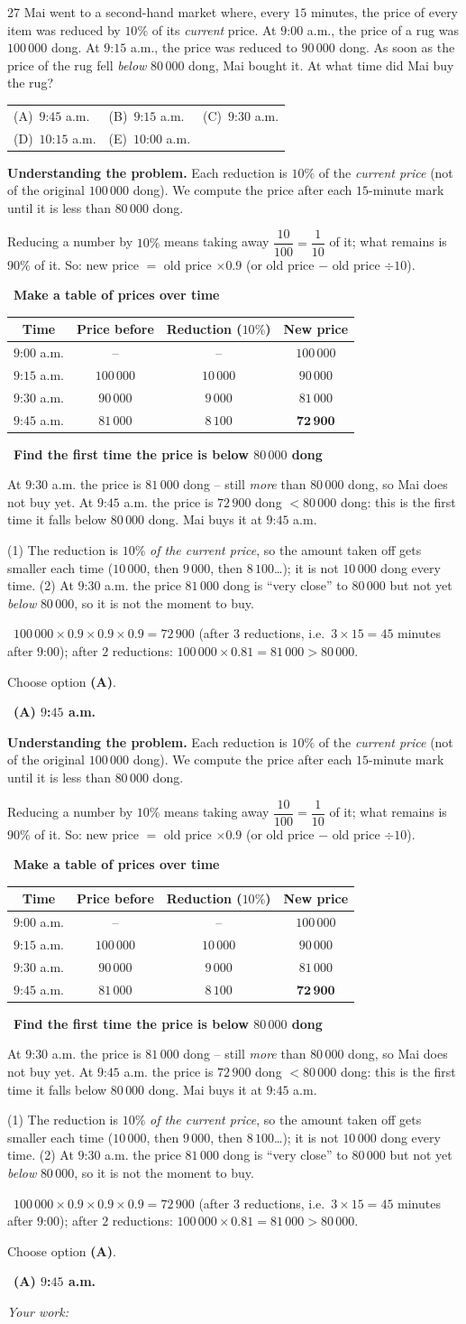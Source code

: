 \documentclass[11pt]{article}
\makeatletter
\newif\ifsol \soltrue
\providecommand{\AnsWord}{Đáp số}
\newcommand{\ans}[1]{\par\smallskip{\bfseries\color{tmGreen!88!black}\AnsWord:}\ {\bfseries\color{AnsRed}#1}\par}
\newcommand{\probsol}[1]{%
  \begin{lrbox}{\solmeasure}\begin{minipage}{\dimexpr\linewidth-24pt\relax}#1\end{minipage}\end{lrbox}%
  \ifsol
    \begin{solbox}#1\end{solbox}%
  \else
    \setlength{\solht}{\dimexpr\ht\solmeasure+\dp\solmeasure+0.85cm\relax}%
    \ifdim\solht<1.35cm\setlength{\solht}{1.35cm}\fi
    \ifdim\solht>\StudentMaxWork\setlength{\solht}{\StudentMaxWork}\fi
    \begin{tcolorbox}[colback=white,colframe=Line,boxrule=0.8pt,arc=5pt,
      left=8pt,right=8pt,top=4pt,bottom=4pt,height=\solht]{\footnotesize\color{Slate}\itshape\WorkWord}\end{tcolorbox}%
  \fi}
\newlength{\StudentMaxWork}\setlength{\StudentMaxWork}{7.5cm}
\newcommand{\step}[2]{\par\smallskip\noindent{\bfseries\color{tmBlue!85!black}\StepWord~#1.}\ {\bfseries #2}\par\nopagebreak}
\newcommand{\verify}[1]{\par\smallskip\noindent{\bfseries\color{tmGreen!80!black}\faCheckCircle\ \CheckWord}\ #1\par}
\newcommand{\choicesII}[5]{\par\smallskip\noindent
  \begin{tabularx}{\linewidth}{@{}XXX@{}}(A)\ #1&(B)\ #2&(C)\ #3\\(D)\ #4&(E)\ #5&\end{tabularx}\par}
\def\WorkWord{Your work:}
\def\AnsWord{Answer}
\def\StepWord{Step}
\def\CheckWord{Check:}
\makeatother
\begin{document}
\begin{probbox}{27}{\relax}
Mai went to a second-hand market where, every $15$ minutes, the price of every item was reduced by $10\%$ of its \emph{current} price. At $9$:$00$ a.m., the price of a rug was $100\,000$ dong. At $9$:$15$ a.m., the price was reduced to $90\,000$ dong. As soon as the price of the rug fell \emph{below} $80\,000$ dong, Mai bought it. At what time did Mai buy the rug?
\choicesII{$9$:$45$ a.m.}{$9$:$15$ a.m.}{$9$:$30$ a.m.}{$10$:$15$ a.m.}{$10$:$00$ a.m.}
\end{probbox}
\probsol{
\textbf{Understanding the problem.} Each reduction is $10\%$ of the \emph{current price} (not of the original $100\,000$ dong). We compute the price after each $15$-minute mark until it is less than $80\,000$ dong.

\begin{recallbox}Reducing a number by $10\%$ means taking away $\dfrac{10}{100}=\dfrac1{10}$ of it; what remains is $90\%$ of it. So: new price $=$ old price $\times 0.9$ (or old price $-$ old price $\div 10$).\end{recallbox}

\step{1}{Make a table of prices over time}
\begin{center}
\begin{tabular}{|c|c|c|c|}
\hline
\rowcolor{Tint}\textbf{Time} & \textbf{Price before} & \textbf{Reduction ($10\%$)} & \textbf{New price}\\
\hline
$9$:$00$ a.m. & -- & -- & $100\,000$\\
$9$:$15$ a.m. & $100\,000$ & $10\,000$ & $90\,000$\\
$9$:$30$ a.m. & $90\,000$ & $9\,000$ & $81\,000$\\
$9$:$45$ a.m. & $81\,000$ & $8\,100$ & $\mathbf{72\,900}$\\
\hline
\end{tabular}
\end{center}

\step{2}{Find the first time the price is below $80\,000$ dong}
At $9$:$30$ a.m. the price is $81\,000$ dong -- still \emph{more} than $80\,000$ dong, so Mai does not buy yet. At $9$:$45$ a.m. the price is $72\,900$ dong $<80\,000$ dong: this is the first time it falls below $80\,000$ dong. Mai buys it at $9$:$45$ a.m.

\begin{warnbox}(1) The reduction is $10\%$ \emph{of the current price}, so the amount taken off gets smaller each time ($10\,000$, then $9\,000$, then $8\,100$\dots); it is not $10\,000$ dong every time. (2) At $9$:$30$ a.m. the price $81\,000$ dong is ``very close'' to $80\,000$ but not yet \emph{below} $80\,000$, so it is not the moment to buy.\end{warnbox}

\verify{$100\,000\times 0.9\times 0.9\times 0.9=72\,900$ (after $3$ reductions, i.e.\ $3\times 15=45$ minutes after $9$:$00$); after $2$ reductions: $100\,000\times0.81=81\,000>80\,000$.}
Choose option \textbf{(A)}.
\ans{(A) $9$:$45$ a.m.}
}
\end{document}
